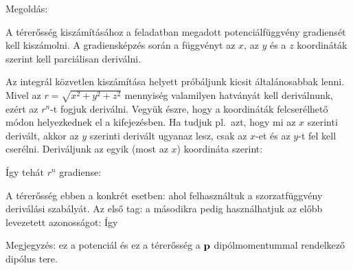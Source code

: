 
\ifdefined\megoldas

 Megoldás: 

 A térerősség kiszámításához a feladatban megadott potenciálfüggvény gradiensét kell kiszámolni. A gradiensképzés során a függvényt az $x$, az $y$ és a $z$ koordináták szerint kell parciálisan deriválni. 

 Az integrál közvetlen kiszámítása helyett próbáljunk kicsit általánosabbak lenni. Mivel az $r=\sqrt{x^2+y^2+z^2}$ mennyiség valamilyen hatványát kell deriválnunk, ezért az $r^n$-t fogjuk deriválni. Vegyük észre, hogy a koordináták felcserélhető módon helyezkednek el a kifejezésben. Ha tudjuk pl.\ azt, hogy mi az $x$ szerinti derivált, akkor az $y$ szerinti derivált ugyanaz lesz, csak az $x$-et és az $y$-t fel kell cserélni. Deriváljunk az egyik (most az $x$) koordináta szerint:

 Így tehát $r^n$ gradiense:

 A térerősség ebben a konkrét esetben:
 ahol felhasználtuk a szorzatfüggvény deriválási szabályát. Az első tag:
 a másodikra pedig használhatjuk az előbb levezetett azonosságot:
 Így

 Megjegyzés: ez a potenciál és ez a térerősség a $\mathbf{p}$ dipólmomentummal rendelkező dipólus tere.

\fi